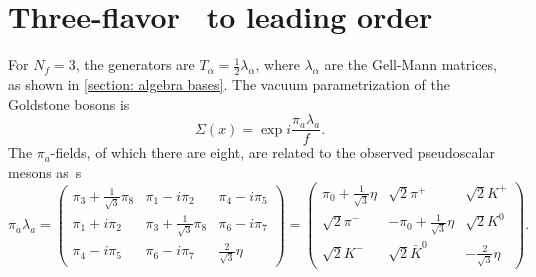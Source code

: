 \section{Three-flavor \chpt\ to leading order}
\label{section: three-flavor chpt to leading order}

For $N_f = 3$, the generators are $T_\alpha = \frac{1}{2} \lambda_\alpha$, where $\lambda_\alpha$ are the Gell-Mann matrices, as shown in \autoref{section: algebra bases}.
The vacuum parametrization of the Goldstone bosons is
%
\begin{equation}
    \Sigma(x) = \exp{i\frac{\pi_a \lambda_a}{f}}.
\end{equation}
%
The $\pi_a$-fields, of which there are eight, are related to the observed pseudoscalar mesons as~s\autocite{schererIntroductionChiralPerturbation2002}
%
\begin{equation}
    \pi_a \lambda_a
    =
    \begin{pmatrix}
        \pi_3 + \frac{1}{\sqrt{3}} \pi_8 & \pi_1 - i \pi_2 & \pi_4 - i \pi_5 \\
        \pi_1 + i \pi_2 & \pi_3 + \frac{1}{\sqrt{3}} \pi_8 & \pi_6 - i \pi_7  \\
        \pi_4 - i \pi_5 & \pi_6 - i \pi_7  & \frac{2}{\sqrt{3}} \eta
    \end{pmatrix}
    =
    \begin{pmatrix}
        \pi_0 + \frac{1}{\sqrt{3}}\eta & \sqrt{2}\pi^+ & \sqrt{2}K^+ \\
        \sqrt{2}\pi^- & -\pi_0 + \frac{1}{\sqrt{3}}\eta & \sqrt{2}K^0 \\
        \sqrt{2}K^- & \sqrt{2}\bar K^0  & - \frac{2}{\sqrt 3} \eta
    \end{pmatrix}.
\end{equation}
%

